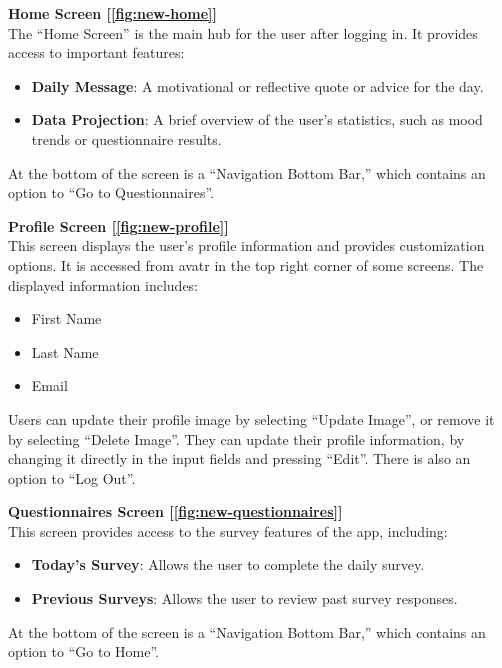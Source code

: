 \vspace{5mm}

\noindent \textbf{Home Screen [\ref{fig:new-home}]} \\
The ``Home Screen'' is the main hub for the user after logging in. It provides access to important features:
\begin{itemize}
    \item \textbf{Daily Message}: A motivational or reflective quote or advice for the day.
    \item \textbf{Data Projection}: A brief overview of the user's statistics, such as mood trends or questionnaire results.
\end{itemize}
\noindent At the bottom of the screen is a ``Navigation Bottom Bar,'' which contains an option to ``Go to Questionnaires''.

\vspace{5mm}

\noindent \textbf{Profile Screen [\ref{fig:new-profile}]} \\
This screen displays the user's profile information and provides customization options. It is accessed from avatr in the top right corner of some screens. The displayed information includes:
\begin{itemize}
    \item First Name
    \item Last Name
    \item Email
\end{itemize}
\noindent Users can update their profile image by selecting ``Update Image'', or remove it by selecting ``Delete Image''. They can update their profile information, by changing it directly in the input fields and pressing ``Edit''. There is also an option to ``Log Out''.

\vspace{5mm}

\noindent \textbf{Questionnaires Screen [\ref{fig:new-questionnaires}]} \\
This screen provides access to the survey features of the app, including:
\begin{itemize}
    \item \textbf{Today's Survey}: Allows the user to complete the daily survey.
    \item \textbf{Previous Surveys}: Allows the user to review past survey responses.
\end{itemize}
\noindent At the bottom of the screen is a ``Navigation Bottom Bar,'' which contains an option to ``Go to Home''.

